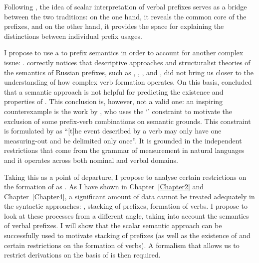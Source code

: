 Following \citet{Filip:08}, the idea of scalar interpretation of verbal prefixes serves as a bridge between the two traditions: on the one hand, it reveals the common core of the prefixes, and on the other hand, it provides the space for explaining the distinctions between individual prefix usages. 

I propose to use a  to prefix semantics in order to account for another complex issue: . \citet{Tatevosov:09} correctly notices that descriptive approaches and structuralist theories of the semantics of Russian prefixes, such as \citet{Avilova:64}, \citet{Golovin:59}, \citet{Lopatin:97}, and \citet{Tixonov:98}, did not bring us closer to the understanding of how complex verb formation operates. On this basis, \citet{Tatevosov:09} concluded that a semantic approach is not helpful for predicting the existence and properties of . This conclusion is, however, not a valid one: an inspiring counterexample is the work by \citet{Filip:03}, who uses the `' constraint to motivate the exclusion of some prefix-verb combinations on semantic grounds. This constraint is formulated by \citet[79]{Tenny:94} as ``[t]he event described by a verb may only have one measuring-out and be delimited only once''. It is grounded in the independent restrictions that come from the grammar of measurement in natural languages and it operates across both nominal and verbal domains. 

Taking this as a point of departure, I propose to analyse certain restrictions on the formation of  as . As I have shown in Chapter~\ref{Chapter2} and Chapter~\ref{Chapter4}, a significant amount of data cannot be treated adequately in the syntactic approaches: , stacking of prefixes, formation of  verbs. I propose to look at these processes from a different angle, taking into account the semantics of verbal prefixes. I will show that the scalar semantic approach can be successfully used to motivate stacking of prefixes (as well as the existence of  and certain restrictions on the formation of  verbs). A formalism that allows us to restrict derivations on the basis of  is then required. 


